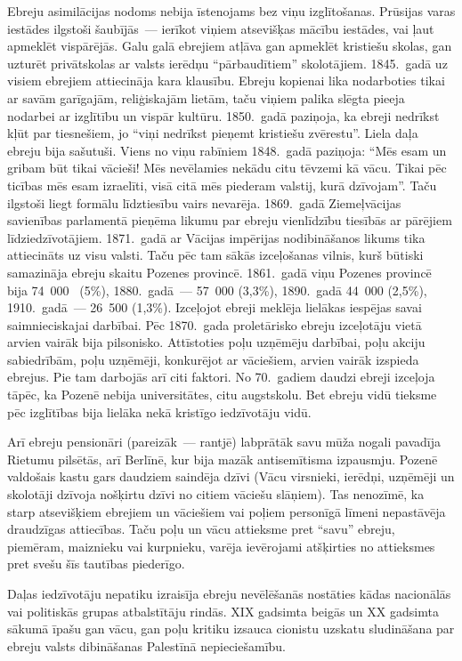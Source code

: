 \documentclass[twoside,a5paper,12pt,fleqn,openany]{extbook}
\begin{document}
Ebreju asimilācijas nodoms nebija īstenojams bez viņu izglītošanas. Prūsijas varas iestādes ilgstoši šaubījās~--- ierīkot viņiem atsevišķas mācību iestādes, vai ļaut apmeklēt vispārējās. Galu galā ebrejiem atļāva gan apmeklēt kristiešu skolas, gan uzturēt privātskolas ar valsts ierēdņu ``pārbaudītiem'' skolotājiem. 1845.~gadā uz visiem ebrejiem attiecināja kara klausību. Ebreju kopienai lika nodarboties tikai ar savām garīgajām, reliģiskajām lietām, taču viņiem palika slēgta pieeja nodarbei ar izglītību un vispār kultūru. 1850.~gadā paziņoja, ka ebreji nedrīkst kļūt par tiesnešiem, jo ``viņi nedrīkst pieņemt kristiešu zvērestu''. Liela daļa ebreju bija sašutuši. Viens no viņu rabīniem 1848.~gadā paziņoja: ``Mēs esam un gribam būt tikai vācieši! Mēs nevēlamies nekādu citu tēvzemi kā vācu. Tikai pēc ticības mēs esam izraelīti, visā citā mēs piederam valstij, kurā dzīvojam''. Taču ilgstoši liegt formālu līdztiesību vairs nevarēja. 1869.~gadā Ziemeļvācijas savienības parlamentā pieņēma likumu par ebreju vienlīdzību tiesībās ar pārējiem līdziedzīvotājiem. 1871.~gadā ar Vācijas impērijas nodibināšanos likums tika attiecināts uz visu valsti. Taču pēc tam sākās izceļošanas vilnis, kurš būtiski samazināja ebreju skaitu Pozenes provincē. 1861.~gadā viņu Pozenes provincē bija 74~000~ (5\%), 1880.~gadā~--- 57~000 (3,3\%), 1890.~gadā 44~000 (2,5\%), 1910.~gadā~--- 26~500 (1,3\%). Izceļojot ebreji meklēja lielākas iespējas savai saimnieciskajai darbībai. Pēc 1870.~gada proletārisko ebreju izceļotāju vietā arvien vairāk bija pilsonisko. Attīstoties poļu uzņēmēju darbībai, poļu akciju sabiedrībām, poļu uzņēmēji, konkurējot ar vāciešiem, arvien vairāk izspieda ebrejus. Pie tam darbojās arī citi faktori. No 70.~gadiem daudzi ebreji izceļoja tāpēc, ka Pozenē nebija universitātes, citu augstskolu. Bet ebreju vidū tieksme pēc izglītības bija lielāka nekā kristīgo iedzīvotāju vidū.

Arī ebreju pensionāri (pareizāk~--- rantjē) labprātāk savu mūža nogali pavadīja Rietumu pilsētās, arī Berlīnē, kur bija mazāk antisemītisma izpausmju. Pozenē valdošais kastu gars daudziem saindēja dzīvi (Vācu virsnieki, ierēdņi, uzņēmēji un skolotāji dzīvoja nošķirtu dzīvi no citiem vāciešu slāņiem). Tas nenozīmē, ka starp atsevišķiem ebrejiem un vāciešiem vai poļiem personīgā līmeni nepastāvēja draudzīgas attiecības. Taču poļu un vācu attieksme pret ``savu'' ebreju, piemēram, maiznieku vai kurpnieku, varēja ievērojami atšķirties no attieksmes pret svešu šīs tautības piederīgo.

Daļas iedzīvotāju nepatiku izraisīja ebreju nevēlēšanās nostāties kādas nacionālās vai politiskās grupas atbalstītāju rindās. XIX gadsimta beigās un XX gadsimta sākumā īpašu gan vācu, gan poļu kritiku izsauca cionistu uzskatu sludināšana par ebreju valsts dibināšanas Palestīnā nepieciešamību.
\end{document}
